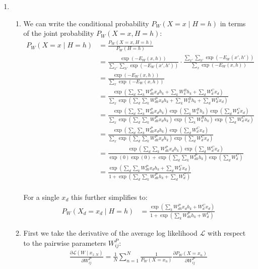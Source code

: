 \documentclass[12pt]{article}
\begin{document}
\begin{enumerate}

\item %
\begin{enumerate}
\item
We can write the conditional probability $P_W(X=x\mid H=h)$ in terms of the joint probability $P_W(X=x,H=h)$:
\begin{align*}
P_W(X=x\mid H=h) &= \frac{P_W(X=x,H=h)}{P_W(H=h)}\\
&= \frac{\exp(-E_W(x,h))}{\sum_{x'}\sum_{h'}\exp(-E_W(x',h'))} \cdot \frac{\sum_{x'}\sum_{h'}\exp(-E_W(x',h'))}{\sum_{x}\exp(-E_W(x,h))}\\
&= \frac{\exp(-E_W(x,h))}{\sum_{x}\exp(-E_W(x,h))}\\
&= \frac{\exp(\sum_d\sum_kW^P_{dk}x_dh_k + \sum_kW^B_kh_k + \sum_dW^C_dx_d)}{\sum_x\exp(\sum_d\sum_kW^P_{dk}x_dh_k + \sum_kW^B_kh_k + \sum_dW^C_dx_d)}\\
&= \frac{\exp(\sum_d\sum_kW^P_{dk}x_dh_k)\exp(\sum_kW^B_kh_k)\exp(\sum_dW^C_dx_d)}{\sum_x\exp(\sum_d\sum_kW^P_{dk}x_dh_k)\exp(\sum_kW^B_kh_k)\exp(\sum_dW^C_dx_d)}\\
&= \frac{\exp(\sum_d\sum_kW^P_{dk}x_dh_k)\exp(\sum_dW^C_dx_d)}{\sum_x\exp(\sum_d\sum_kW^P_{dk}x_dh_k)\exp(\sum_dW^C_dx_d)}\\
&= \frac{\exp(\sum_d\sum_kW^P_{dk}x_dh_k)\exp(\sum_dW^C_dx_d)}{ \exp(0)\exp(0) + \exp(\sum_d\sum_kW^P_{dk}h_k)\exp(\sum_dW^C_d)}\\
&= \frac{\exp(\sum_d\sum_kW^P_{dk}x_dh_k + \sum_dW^C_dx_d)}{1 + \exp(\sum_d\sum_kW^P_{dk}h_k + \sum_dW^C_d)}\\
\end{align*}

For a single $x_d$ this further simplifies to:
\begin{align*}
P_W(X_d=x_d\mid H=h) &= \frac{\exp(\sum_kW^P_{dk}x_dh_k + W^C_dx_d)}{1 + \exp(\sum_kW^P_{dk}h_k + W^C_d)}
\end{align*}

\item
First we take the derivative of the average log likelihood $\mathcal{L}$ with respect to the pairwise parameters $W^P_{ij}$:
\begin{align*}
\frac{\partial\mathcal{L}(W\mid x_{1:N})}{\partial W^P_{ij}} = \frac{1}{N}\sum_{n=1}^N \frac{1}{P_W(X=x_n)}\frac{\partial P_W(X=x_n)}{\partial W^P_{ij}}
\end{align*}


\end{enumerate}
\end{enumerate}
\end{document}
